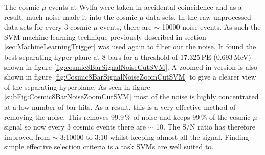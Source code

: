 The cosmic $\mu$ events at Wylfa were taken in accidental coincidence and as a result, much noise made it into the cosmic $\mu$ data sets. In the raw unprocessed data sets for every 3 cosmic $\mu$ events, there are $\sim$ 10000 noise events. As such the SVM machine learning technique previously described in section \ref{sec:MachineLearningTrigger} was used again to filter out the noise. It found the best separating hyper-plane at 8 bars for a threshold of 17.325\,PE (0.693\,MeV) shown in figure \ref{fig:cosmic8BarSignalNoiseCutSVM}. A zoomed-in version is also shown in figure \ref{fig:Cosmic8BarSignalNoiseZoomCutSVM} to give a clearer view of the separating hyperplane. As seen in figure \ref{subFig:Cosmic8BarNoiseZoomCutSVM} most of the noise is highly concentrated at a low number of bar hits. As a result, this is a very effective method of removing the noise. This removes 99.9\,\% of noise and keeps 99\,\% of the cosmic $\mu$ signal so now every 3 cosmic events there are $\sim$ 10. The S/N ratio has therefore improved from $\sim$ 3:10000 to 3:10 whilst keeping almost all the signal. Finding simple effective selection criteria is a task SVMs are well suited to. 

